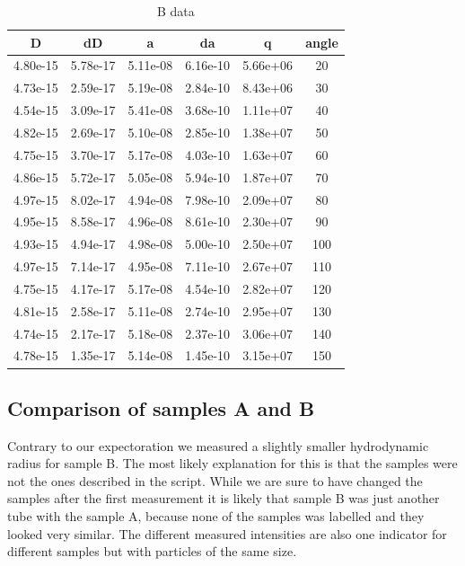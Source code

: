 \documentclass[]{article}
\begin{document}
\begin{table}[!htbp]
	\centering
	\begin{tabular}{|c|c|c|c|c|c|}
		\hline
		D & dD & a & da & q & angle \\ \hline\hline
		4.80e-15 & 5.78e-17 & 5.11e-08 & 6.16e-10 & 5.66e+06 & 20 \\ \hline
		4.73e-15 & 2.59e-17 & 5.19e-08 & 2.84e-10 & 8.43e+06 & 30 \\ \hline
		4.54e-15 & 3.09e-17 & 5.41e-08 & 3.68e-10 & 1.11e+07 & 40 \\ \hline
		4.82e-15 & 2.69e-17 & 5.10e-08 & 2.85e-10 & 1.38e+07 & 50 \\ \hline
		4.75e-15 & 3.70e-17 & 5.17e-08 & 4.03e-10 & 1.63e+07 & 60 \\ \hline
		4.86e-15 & 5.72e-17 & 5.05e-08 & 5.94e-10 & 1.87e+07 & 70 \\ \hline
		4.97e-15 & 8.02e-17 & 4.94e-08 & 7.98e-10 & 2.09e+07 & 80 \\ \hline
		4.95e-15 & 8.58e-17 & 4.96e-08 & 8.61e-10 & 2.30e+07 & 90 \\ \hline
		4.93e-15 & 4.94e-17 & 4.98e-08 & 5.00e-10 & 2.50e+07 & 100 \\ \hline
		4.97e-15 & 7.14e-17 & 4.95e-08 & 7.11e-10 & 2.67e+07 & 110 \\ \hline
		4.75e-15 & 4.17e-17 & 5.17e-08 & 4.54e-10 & 2.82e+07 & 120 \\ \hline
		4.81e-15 & 2.58e-17 & 5.11e-08 & 2.74e-10 & 2.95e+07 & 130 \\ \hline
		4.74e-15 & 2.17e-17 & 5.18e-08 & 2.37e-10 & 3.06e+07 & 140 \\ \hline
		4.78e-15 & 1.35e-17 & 5.14e-08 & 1.45e-10 & 3.15e+07 & 150 \\ \hline
		\hline
	\end{tabular}
	\caption{B data}
	\label{tab:bdata}
\end{table}

\subsection{Comparison of samples A and B}
Contrary to our expectoration we measured a slightly smaller hydrodynamic radius for sample B. The most likely explanation for this is that the samples were not the ones described in the script. While we are sure to have changed the samples after the first measurement it is likely that sample B was just another tube with the sample A, because none of the samples was labelled and they looked very similar. The different measured intensities are also one indicator for different samples but with particles of the same size.
\end{document}

